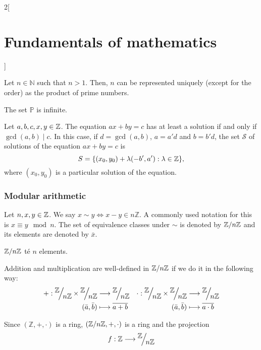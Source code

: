 \documentclass[../../../main.tex]{subfiles}
\begin{document}
\begin{multicols}{2}[\section{Fundamentals of mathematics}]
\begin{theorem}
        Let $n\in\mathbb{N}$ such that $n>1$. Then, $n$ can be represented uniquely (except for the order) as the product of prime numbers.
    \end{theorem}
    \begin{theorem}
        The set $\mathbb{P}$ is infinite.
    \end{theorem}
    \begin{theorem}
        Let $a,b,c,x,y\in\mathbb{Z}$. The equation $ax+by=c$ has at least a solution if and only if $\gcd(a,b)\mid c$. In this case, if $d=\gcd(a,b)$, $a=a'd$ and $b=b'd$, the set $\mathcal{S}$ of solutions of the equation $ax+by=c$ is $$S=\{(x_0,y_0)+\lambda(-b',a'):\lambda\in\mathbb{Z}\},$$ where $(x_0,y_0)$ is a particular solution of the equation.
    \end{theorem}
    \subsubsection*{Modular arithmetic}
    \begin{definition}
        Let $n,x,y\in\mathbb{Z}$. We say $x\sim y\iff x-y\in n\mathbb{Z}$. A commonly used notation for this is $x\equiv y\mod n$. The set of equivalence classes under $\sim$ is denoted by $\quot{\mathbb{Z}}{n\mathbb{Z}}$ and its elements are denoted by $\bar{x}$.
    \end{definition}
    \begin{lemma}
        $\quot{\ZZ}{n\ZZ}$ té $n$ elements.
    \end{lemma}
    \begin{prop}
        Addition and multiplication are well-defined in $\quot{\ZZ}{n\ZZ}$ if we do it in the following way:
        \begin{align*}
            +:\quot{\ZZ}{n\ZZ}\times\quot{\ZZ}{n\ZZ} & \longrightarrow\quot{\ZZ}{n\ZZ} & \cdot:\quot{\ZZ}{n\ZZ}\times\quot{\ZZ}{n\ZZ} & \longrightarrow\quot{\ZZ}{n\ZZ} \\
            (\bar{a},\bar{b})                        & \longmapsto\overline{a+b}       & (\bar{a},\bar{b})                            & \longmapsto\overline{a\cdot b}
        \end{align*}
    \end{prop}
    \begin{theorem}
        Since $(\mathbb{Z},+,\cdot)$ is a ring, $(\quot{\ZZ}{n\ZZ},+,\cdot)$ is a ring and the projection
        \begin{align*}
            f:\mathbb{Z} & \longrightarrow\quot{\ZZ}{n\ZZ} \\

\end{align*}
\end{theorem}
\end{multicols}
\end{document}
